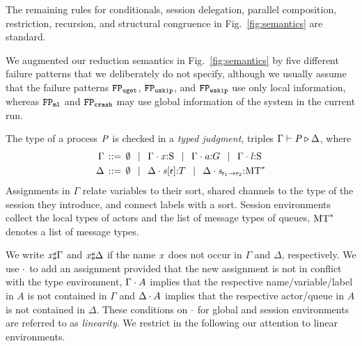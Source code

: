 The remaining rules for conditionals, session delegation, parallel composition, restriction, recursion, and structural congruence in Fig.~\ref{fig:semantics} are standard.

We augmented our reduction semantics in Fig.~\ref{fig:semantics} by five different failure patterns that we deliberately do not specify, although we usually assume that the failure patterns $ \fpUGet $, $ \fpUSkip $, and $ \fpWSkip $ use only local information, whereas $ \fpML $ and $ \fpCrash $ may use global information of the system in the current run.



The type of a process $ \PT $ is checked in a \emph{typed judgment}, \ie triples $ \Gamma \vdash \PT \triangleright \Delta $, where
\begin{align*}
	\Gamma & \deffTerms \emptyset
		\sepTerms \Gamma \compS \Typed{\Args}{\Sort}
		\sepTerms \Gamma \compS \Typed{\Chan[a]}{\GT}
		\sepTerms \Gamma \compS \Typed{\Label}{\Sort}\\
	\Delta &\deffTerms \emptyset
		\sepTerms \Delta \compS \Typed{\AT{\Chan}{\Role}}{\LT}
		\sepTerms \Delta \compS \MQ{\Chan}{\Role_1}{\Role_2}{\MT^*}
\end{align*}
Assignments in $ \Gamma $ relate variables to their sort, shared channels to the type of the session they introduce, and connect labels with a sort.
Session environments collect the local types of actors and the list of message types of queues, \ie $ \MT^* $ denotes a list of message types.

We write $ \Args \sharp \Gamma $ and $ \Args \sharp \Delta $ if the name $ \Args $ does not occur in $ \Gamma $ and $ \Delta $, respectively.
We use $ \compS $ to add an assignment provided that the new assignment is not in conflict with the type environment, \ie $ \Gamma \compS A $ implies that the respective name/variable/label in $ A $ is not contained in $ \Gamma $ and $ \Delta \compS A $ implies that the respective actor/queue in $ A $ is not contained in $ \Delta $.
These conditions on $ \compS $ for global and session environments are referred to as \emph{linearity}.
We restrict in the following our attention to linear environments.

